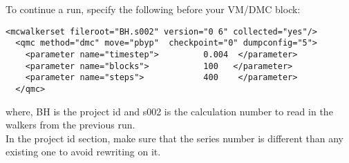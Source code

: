 \begin{itemize}
To continue a run, specify the following before your VM/DMC block:
\begin{lstlisting}[caption=Restart (read wakers from previous run) ]
 <mcwalkerset fileroot="BH.s002" version="0 6" collected="yes"/>
  <qmc method="dmc" move="pbyp"  checkpoint="0" dumpconfig="5">
    <parameter name="timestep">         0.004  </parameter>
    <parameter name="blocks">           100   </parameter>
    <parameter name="steps">            400    </parameter>
  </qmc>
\end{lstlisting}
where, BH is the project id and s002 is the calculation number to read in the walkers from the previous run.\\ In the project id section, make sure that the series number is different than any existing one to avoid rewriting on it. 

\end{itemize}
